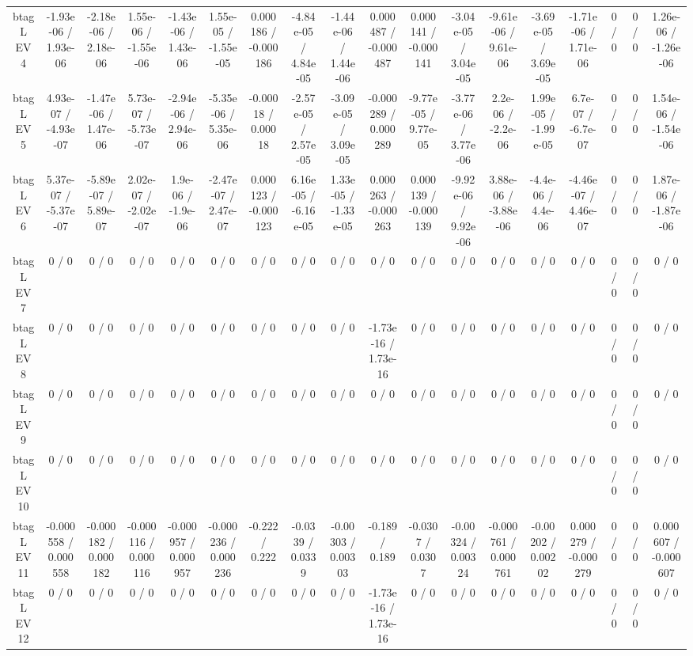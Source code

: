 \documentclass[10pt]{article}
\begin{document}
\begin{table}[htbp]
\begin{center}
\begin{tabular}{|c|c|c|c|c|c|c|c|c|c|c|c|c|c|c|c|c|c|}
  btag L EV 4 & -1.93e-06 / 1.93e-06 & -2.18e-06 / 2.18e-06 & 1.55e-06 / -1.55e-06 & -1.43e-06 / 1.43e-06 & 1.55e-05 / -1.55e-05 & 0.000186 / -0.000186 & -4.84e-05 / 4.84e-05 & -1.44e-06 / 1.44e-06 & 0.000487 / -0.000487 & 0.000141 / -0.000141 & -3.04e-05 / 3.04e-05 & -9.61e-06 / 9.61e-06 & -3.69e-05 / 3.69e-05 & -1.71e-06 / 1.71e-06 & 0 / 0 & 0 / 0 & 1.26e-06 / -1.26e-06 \\ 
  btag L EV 5 & 4.93e-07 / -4.93e-07 & -1.47e-06 / 1.47e-06 & 5.73e-07 / -5.73e-07 & -2.94e-06 / 2.94e-06 & -5.35e-06 / 5.35e-06 & -0.00018 / 0.00018 & -2.57e-05 / 2.57e-05 & -3.09e-05 / 3.09e-05 & -0.000289 / 0.000289 & -9.77e-05 / 9.77e-05 & -3.77e-06 / 3.77e-06 & 2.2e-06 / -2.2e-06 & 1.99e-05 / -1.99e-05 & 6.7e-07 / -6.7e-07 & 0 / 0 & 0 / 0 & 1.54e-06 / -1.54e-06 \\ 
  btag L EV 6 & 5.37e-07 / -5.37e-07 & -5.89e-07 / 5.89e-07 & 2.02e-07 / -2.02e-07 & 1.9e-06 / -1.9e-06 & -2.47e-07 / 2.47e-07 & 0.000123 / -0.000123 & 6.16e-05 / -6.16e-05 & 1.33e-05 / -1.33e-05 & 0.000263 / -0.000263 & 0.000139 / -0.000139 & -9.92e-06 / 9.92e-06 & 3.88e-06 / -3.88e-06 & -4.4e-06 / 4.4e-06 & -4.46e-07 / 4.46e-07 & 0 / 0 & 0 / 0 & 1.87e-06 / -1.87e-06 \\ 
  btag L EV 7 & 0 / 0 & 0 / 0 & 0 / 0 & 0 / 0 & 0 / 0 & 0 / 0 & 0 / 0 & 0 / 0 & 0 / 0 & 0 / 0 & 0 / 0 & 0 / 0 & 0 / 0 & 0 / 0 & 0 / 0 & 0 / 0 & 0 / 0 \\ 
  btag L EV 8 & 0 / 0 & 0 / 0 & 0 / 0 & 0 / 0 & 0 / 0 & 0 / 0 & 0 / 0 & 0 / 0 & -1.73e-16 / 1.73e-16 & 0 / 0 & 0 / 0 & 0 / 0 & 0 / 0 & 0 / 0 & 0 / 0 & 0 / 0 & 0 / 0 \\ 
  btag L EV 9 & 0 / 0 & 0 / 0 & 0 / 0 & 0 / 0 & 0 / 0 & 0 / 0 & 0 / 0 & 0 / 0 & 0 / 0 & 0 / 0 & 0 / 0 & 0 / 0 & 0 / 0 & 0 / 0 & 0 / 0 & 0 / 0 & 0 / 0 \\ 
  btag L EV 10 & 0 / 0 & 0 / 0 & 0 / 0 & 0 / 0 & 0 / 0 & 0 / 0 & 0 / 0 & 0 / 0 & 0 / 0 & 0 / 0 & 0 / 0 & 0 / 0 & 0 / 0 & 0 / 0 & 0 / 0 & 0 / 0 & 0 / 0 \\ 
  btag L EV 11 & -0.000558 / 0.000558 & -0.000182 / 0.000182 & -0.000116 / 0.000116 & -0.000957 / 0.000957 & -0.000236 / 0.000236 & -0.222 / 0.222 & -0.0339 / 0.0339 & -0.00303 / 0.00303 & -0.189 / 0.189 & -0.0307 / 0.0307 & -0.00324 / 0.00324 & -0.000761 / 0.000761 & -0.00202 / 0.00202 & 0.000279 / -0.000279 & 0 / 0 & 0 / 0 & 0.000607 / -0.000607 \\ 
  btag L EV 12 & 0 / 0 & 0 / 0 & 0 / 0 & 0 / 0 & 0 / 0 & 0 / 0 & 0 / 0 & 0 / 0 & -1.73e-16 / 1.73e-16 & 0 / 0 & 0 / 0 & 0 / 0 & 0 / 0 & 0 / 0 & 0 / 0 & 0 / 0 & 0 / 0 \\ 

\end{tabular}
\end{center}
\end{table}
\end{document}
